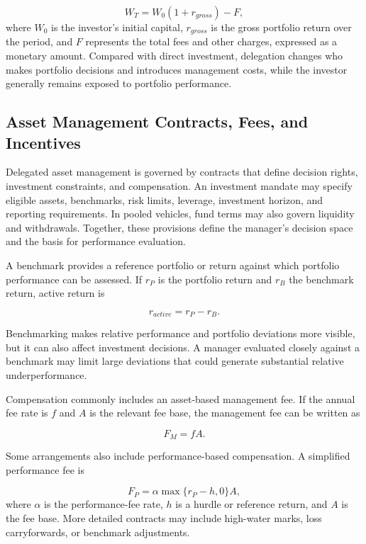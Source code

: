\begin{equation}
W_T=W_0(1+r_{gross})-F,
\label{eq:ch14-investor-terminal-wealth}
\end{equation}
where $W_0$ is the investor's initial capital, $r_{gross}$ is the
gross portfolio return over the period, and $F$ represents
the total fees and other charges, expressed as a monetary
amount. Compared with direct investment, delegation changes who makes portfolio decisions and introduces management costs, while the investor generally remains exposed to portfolio performance.

\subsection{Asset Management Contracts, Fees, and Incentives}

Delegated asset management is governed by contracts that define decision rights, investment constraints, and compensation. An investment mandate may specify eligible assets, benchmarks, risk limits, leverage, investment horizon, and reporting requirements. In pooled vehicles, fund terms may also govern liquidity and withdrawals. Together, these provisions define the manager's decision space and the basis for performance evaluation.

A benchmark provides a reference portfolio or return against which portfolio performance can be assessed. If $r_P$ is the portfolio return and $r_B$ the benchmark return, active return is

\begin{equation}
r_{active}=r_P-r_B.
\label{eq:ch14-active-return}
\end{equation}

Benchmarking makes relative performance and portfolio deviations more visible, but it can also affect investment decisions. A manager evaluated closely against a benchmark may limit large deviations that could generate substantial relative underperformance.

Compensation commonly includes an asset-based management fee. If the annual fee rate is $f$ and $A$ is the relevant fee base, the management fee can be written as

\begin{equation}
F_M=fA.
\label{eq:ch14-management-fee}
\end{equation}

Some arrangements also include performance-based compensation. A simplified performance fee is

\begin{equation}
F_P=\alpha\max\{r_P-h,0\}A,
\label{eq:ch14-performance-fee}
\end{equation}
where $\alpha$ is the performance-fee rate, $h$ is a hurdle or reference return, and $A$ is the fee base. More detailed contracts may include high-water marks, loss carryforwards, or benchmark adjustments.


